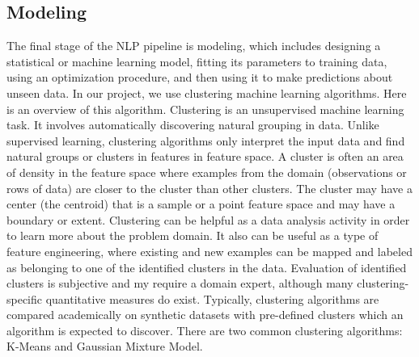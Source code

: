 \documentclass[a4paper,12pt]{report}
\begin{document}
    \subsection{Modeling}
    The final stage of the NLP pipeline is modeling, which includes designing a statistical or machine learning model, 
    fitting its parameters to training data, using an optimization procedure, and then using it to make predictions about unseen data.
In our project, we use clustering machine learning algorithms. Here is an overview of this algorithm. 
Clustering is an unsupervised machine learning task. It involves automatically discovering natural grouping in data. Unlike supervised learning, clustering algorithms only interpret the input data and find natural groups or clusters in features in feature space.
A cluster is often an area of density in the feature space where examples from the domain (observations or rows of data) are closer to the cluster than other clusters. The cluster may have a center (the centroid) that is a sample or a point feature space and may have a boundary or extent.
Clustering can be helpful as a data analysis activity in order to learn more about the problem domain. It also can be useful as a type of feature engineering, where existing and new examples can be mapped and labeled as belonging to one of the identified clusters in the data.
Evaluation of identified clusters is subjective and my require a domain expert, although many clustering-specific quantitative measures do exist. Typically, clustering algorithms are compared academically on synthetic datasets with pre-defined clusters which an algorithm is expected to discover.
There are two common clustering algorithms: K-Means and Gaussian Mixture Model.
    
\end{document}
